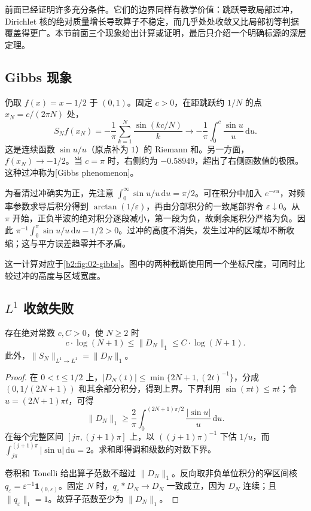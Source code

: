 
前面已经证明许多充分条件。它们的边界同样有教学价值：跳跃导致局部过冲，Dirichlet 核的绝对质量增长导致算子不稳定，而几乎处处收敛又比局部初等判据覆盖得更广。本节前面三个现象给出计算或证明，最后只介绍一个明确标源的深层定理。

\subsection{Gibbs 现象}
\label{b2:subsec:020701}

仍取 \(f(x)=x-1/2\) 于 \((0,1)\)。固定 \(c>0\)，在距跳跃约 \(1/N\) 的点 \(x_N=c/(2\pi N)\) 处，
\[
 S_Nf(x_N)=-\dfrac1\pi\sum_{k=1}^N\dfrac{\sin(kc/N)}k
 \longrightarrow-\dfrac1\pi\int_0^c\dfrac{\sin u}{u}\,\mathrm{d}u.
\]
这是连续函数 \(\sin u/u\)（原点补为 \(1\)）的 Riemann 和。另一方面，\(f(x_N)\to-1/2\)。当 \(c=\pi\) 时，右侧约为 \(-0.58949\)，超出了右侧函数值的极限。这种过冲称为[Gibbs phenomenon]。

\ProseParagraphBreak

为看清过冲确实为正，先注意 \(\int_0^\infty\sin u/u\,\mathrm{d}u=\pi/2\)。可在积分中加入 \(e^{-\varepsilon u}\)，对频率参数求导后积分得到 \(\arctan(1/\varepsilon)\)，再由分部积分的一致尾部界令 \(\varepsilon\downarrow0\)。从 \(\pi\) 开始，正负半波的绝对积分逐段减小，第一段为负，故剩余尾积分严格为负。因此 \(\pi^{-1}\int_0^\pi\sin u/u\,\mathrm{d}u-1/2>0\)。过冲的高度不消失，发生过冲的区域却不断收缩；这与平方误差趋零并不矛盾。

\ProseParagraphBreak

这一计算对应于\cref{b2:fig:02-gibbs}。图中的两种截断使用同一个坐标尺度，可同时比较过冲的高度与区域宽度。


\subsection{\texorpdfstring{\(L^1\)}{L¹} 收敛失败}
\label{b2:subsec:020702}

\begin{proposition}\label{b2:prop:02-lebesgue-constants}
存在绝对常数 \(c,C>0\)，使 \(N\geq2\) 时
\[
 c\cdot\log(N+1)\leq\|D_N\|_1\leq C\cdot\log(N+1).
\]
此外，\(\|S_N\|_{L^1\to L^1}=\|D_N\|_1\)。
\end{proposition}
\begin{proof}
在 \(0<t\leq1/2\) 上，\(|D_N(t)|\leq\min\{2N+1,(2t)^{-1}\}\)，分成 \((0,1/(2N+1))\) 和其余部分积分，得到上界。下界利用 \(\sin(\pi t)\leq\pi t\)；令 \(u=(2N+1)\pi t\)，可得
\[
 \|D_N\|_1\geq\dfrac2\pi\int_0^{(2N+1)\pi/2}\dfrac{|\sin u|}{u}\,\mathrm{d}u.
\]
在每个完整区间 \([j\pi,(j+1)\pi]\) 上，以 \(((j+1)\pi)^{-1}\) 下估 \(1/u\)，而 \(\int_{j\pi}^{(j+1)\pi}|\sin u|\,\mathrm{d}u=2\)。求和即得调和级数的对数下界。

卷积和 Tonelli 给出算子范数不超过 \(\|D_N\|_1\)。反向取非负单位积分的窄区间核 \(q_\varepsilon=\varepsilon^{-1}\mathbf1_{(0,\varepsilon)}\)。固定 \(N\) 时，\(q_\varepsilon*D_N\to D_N\) 一致成立，因为 \(D_N\) 连续；且 \(\|q_\varepsilon\|_1=1\)。故算子范数至少为 \(\|D_N\|_1\)。
\end{proof}

